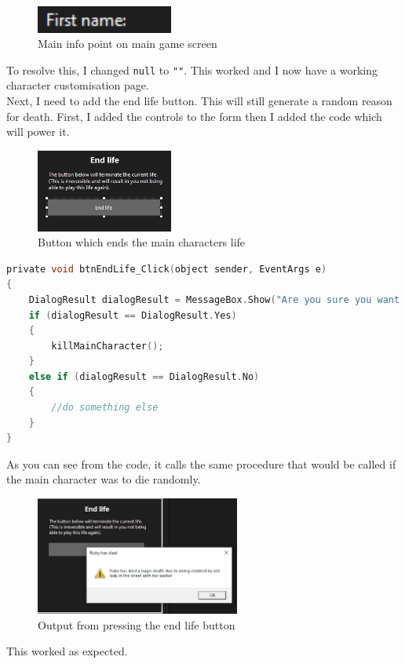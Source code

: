 \begin{figure}[H]
    \centering
    \includegraphics[width=0.4\textwidth]{images/implementation/customise3.png}
    \caption{Main info point on main game screen}
    \label{fig:implementation-customise3}
\end{figure}
\noindent To resolve this, I changed \verb|null| to \verb|""|. This worked and I now have a working character customisation page.\\
Next, I need to add the end life button. This will still generate a random reason for death.
First, I added the controls to the form then I added the code which will power it.\\
\begin{figure}[H]
    \centering
    \includegraphics[width=0.4\textwidth]{images/implementation/endlife1.png}
    \caption{Button which ends the main characters life}
    \label{fig:implementation-endlife1}
\end{figure}
\begin{lstlisting}[language=c, style=csharp, caption=End life algorithm]
private void btnEndLife_Click(object sender, EventArgs e)
{
    DialogResult dialogResult = MessageBox.Show("Are you sure you want to end this life?", "End life", MessageBoxButtons.YesNo);
    if (dialogResult == DialogResult.Yes)
    {
        killMainCharacter();
    }
    else if (dialogResult == DialogResult.No)
    {
        //do something else
    }
}
\end{lstlisting}
As you can see from the code, it calls the same procedure that would be called if the main character was to die randomly.
\begin{figure}[H]
    \centering
    \includegraphics[width=0.6\textwidth]{images/implementation/endlife2.png}
    \caption{Output from pressing the end life button}
    \label{fig:implementation-endlife2}
\end{figure}
\noindent This worked as expected.

